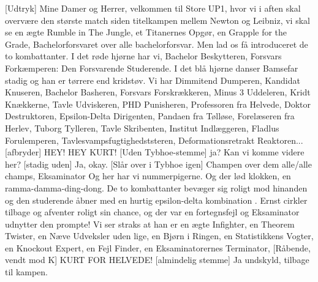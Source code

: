\documentclass[a4paper,11pt]{article}
\begin{document}
\begin{sketch}


[Udtryk] Mine Damer og Herrer, velkommen til Store UP1, hvor vi i aften skal overvære den største match siden titelkampen mellem Newton og Leibniz, vi skal se en ægte Rumble in The Jungle, et Titanernes Opgør, en Grapple for the Grade, Bachelorforsvaret over alle bachelorforsvar. Men lad os få introduceret de to kombattanter.
I det røde hjørne har vi, Bachelor Beskytteren, Forsvars Forkæmperen: Den Forsvarende Studerende.
I det blå hjørne danser Bamsefar stadig og han er tørrere end kridstøv. Vi har Dimmitend Dumperen, Kandidat Knuseren, Bachelor Basheren, Forsvars Forskrækkeren, Minus 3 Uddeleren, Kridt Knækkerne, Tavle Udviskeren, PHD Punisheren, Professoren fra Helvede, Doktor Destruktoren, Epsilon-Delta Dirigenten, Pandaen fra Tølløse, Forelæseren fra Herlev, Tuborg Tylleren, Tavle Skribenten, Institut Indlæggeren, Fladlus Forulemperen, Tavlesvampsfugtighedststeren, Deformationsretrakt Reaktoren...
[afbryder] HEY! HEY KURT!
[Uden Tybhoe-stemme] ja?
 Kan vi komme videre her?
[stadig uden] Ja, okay.
[Slår over i Tybhoe igen] Champen over dem alle/alle champs, Eksaminator
Og her har vi nummerpigerne.
Og der lød klokken, en ramma-damma-ding-dong. De to kombattanter bevæger sig roligt mod hinanden og den studerende åbner med en hurtig epsilon-delta kombination . Ernst cirkler tilbage og afventer roligt sin chance, og der var en fortegnsfejl  og Eksaminator udnytter den prompte!  Vi ser straks at han er en ægte Infighter, en Theorem Twister, en Næve Udveksler uden lige, en Bjørn i Ringen,  en Statistikkens Vogter, en Knockout Expert, en Fejl Finder, en Eksaminatorernes Terminator,
[Råbende, vendt mod K] KURT FOR HELVEDE!
[almindelig stemme] Ja undskyld, tilbage til kampen.

\end{sketch}
\end{document}
